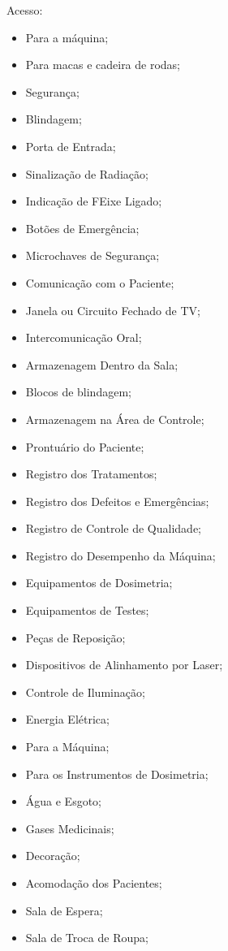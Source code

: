 \documentclass[
	12pt,				%
    oneside,			%
	a4paper,			%
	english,			%
	french,				%
	spanish,			%
	brazil,				%
	]{abntex2}
\begin{document}
Acesso:
\begin{itemize}
	\item Para a máquina;
	\item Para macas e cadeira de rodas;
	\item Segurança;
	\item Blindagem;
	\item Porta de Entrada;
	\item Sinalização de Radiação;
	\item Indicação de FEixe Ligado;
	\item Botões de Emergência;
	\item Microchaves de Segurança;
	\item Comunicação com o Paciente;
	\item Janela ou Circuito Fechado de TV;
	\item Intercomunicação Oral;
	\item Armazenagem Dentro da Sala;
	\item Blocos de blindagem;
	\item Armazenagem na Área de Controle;
	\item Prontuário do Paciente;
	\item Registro dos Tratamentos;
	\item Registro dos Defeitos e Emergências;
	\item Registro de Controle de Qualidade;
	\item Registro do Desempenho da Máquina;
	\item Equipamentos de Dosimetria;
	\item Equipamentos de Testes;
	\item Peças de Reposição;
	\item Dispositivos de Alinhamento por Laser;
	\item Controle de Iluminação;
	\item Energia Elétrica;
	\item Para a Máquina;
	\item Para os Instrumentos de Dosimetria;
	\item Água e Esgoto;
	\item Gases Medicinais;
	\item Decoração;
	\item Acomodação dos Pacientes;
	\item Sala de Espera;
	\item Sala de Troca de Roupa;

\end{itemize}
	
\end{document}
